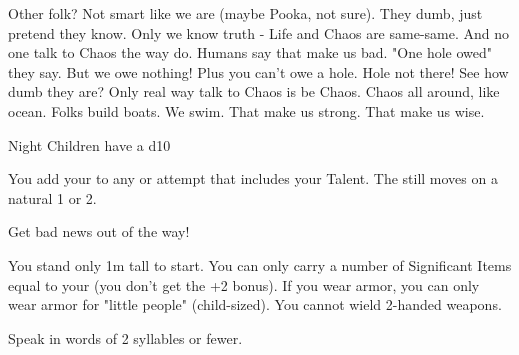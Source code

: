 




  Other folk? Not smart like we are (maybe Pooka, not sure).  They dumb, just pretend they know.  Only we know truth - Life and Chaos are same-same.  And no one talk to Chaos the way  do. Humans say that make us bad. "One hole owed" they say.  But we owe nothing! Plus you can't owe a hole. Hole not there! See how dumb they are? Only real way talk to Chaos is be Chaos.  Chaos all around, like ocean. Folks build boats.  We swim.  That make us strong. That make us wise.




  Night Children have a d10 \FLESH
  
  

  You add your \LVL to any \RO or \RB attempt that includes your Talent.  The \UD still moves \DCDOWN on a natural 1 or 2.



    Get bad news out of the way!

  
  You stand only 1m tall to start.  You can only carry a number of Significant Items equal to your \MAX \VIG (you don't get the +2 bonus). If you wear armor, you can only wear armor for "little people" (child-sized).  You cannot wield 2-handed weapons.

  \cbreak


  Speak in words of 2 syllables or fewer.


